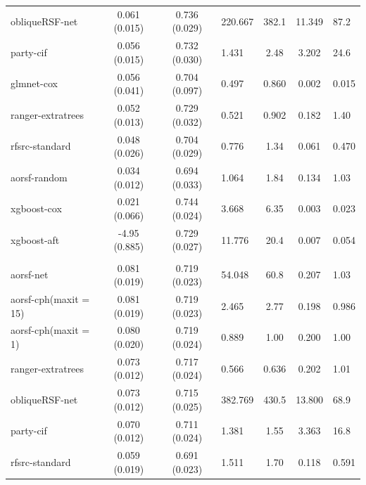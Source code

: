 \documentclass[twoside,11pt]{article}\usepackage[]{graphicx}\usepackage[]{color}
\newenvironment{knitrout}{}{} %
\begin{document}
\begin{knitrout}
\begin{longtable}{lcclccl}
\hspace{1em}obliqueRSF-net & 0.061 (0.015) & 0.736 (0.029) & 220.667 & 382.1 & 11.349 & 87.2\\
\hspace{1em}party-cif & 0.056 (0.015) & 0.732 (0.030) & 1.431 & 2.48 & 3.202 & 24.6\\
\hspace{1em}glmnet-cox & 0.056 (0.041) & 0.704 (0.097) & 0.497 & 0.860 & 0.002 & 0.015\\
\hspace{1em}ranger-extratrees & 0.052 (0.013) & 0.729 (0.032) & 0.521 & 0.902 & 0.182 & 1.40\\
\hspace{1em}rfsrc-standard & 0.048 (0.026) & 0.704 (0.029) & 0.776 & 1.34 & 0.061 & 0.470\\
\hspace{1em}aorsf-random & 0.034 (0.012) & 0.694 (0.033) & 1.064 & 1.84 & 0.134 & 1.03\\
\hspace{1em}xgboost-cox & 0.021 (0.066) & 0.744 (0.024) & 3.668 & 6.35 & 0.003 & 0.023\\
\hspace{1em}xgboost-aft & -4.95 (0.885) & 0.729 (0.027) & 11.776 & 20.4 & 0.007 & 0.054\\
\addlinespace[0.3em]
\hline
\multicolumn{7}{l}{\textit{\textbf{GUIDE-IT; HF hospitalization, n = 894, p = 59}}}\\
\hline
\hspace{1em}aorsf-net & 0.081 (0.019) & 0.719 (0.023) & 54.048 & 60.8 & 0.207 & 1.03\\
\hspace{1em}aorsf-cph(maxit = 15) & 0.081 (0.019) & 0.719 (0.023) & 2.465 & 2.77 & 0.198 & 0.986\\
\hspace{1em}aorsf-cph(maxit = 1) & 0.080 (0.020) & 0.719 (0.024) & 0.889 & 1.00 & 0.200 & 1.00\\
\hspace{1em}ranger-extratrees & 0.073 (0.012) & 0.717 (0.024) & 0.566 & 0.636 & 0.202 & 1.01\\
\hspace{1em}obliqueRSF-net & 0.073 (0.012) & 0.715 (0.025) & 382.769 & 430.5 & 13.800 & 68.9\\
\hspace{1em}party-cif & 0.070 (0.012) & 0.711 (0.024) & 1.381 & 1.55 & 3.363 & 16.8\\
\hspace{1em}rfsrc-standard & 0.059 (0.019) & 0.691 (0.023) & 1.511 & 1.70 & 0.118 & 0.591\\

\end{longtable}
\end{knitrout}
\end{document}
